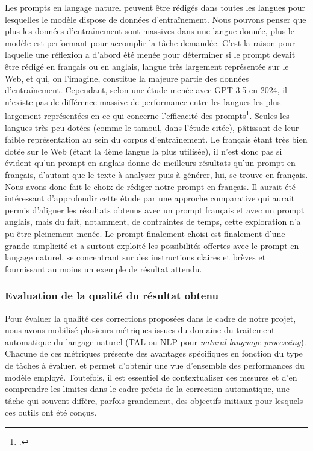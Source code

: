 \newline
Les prompts en langage naturel peuvent être rédigés dans toutes les langues pour lesquelles le modèle dispose de données d’entraînement. Nous pouvons penser que plus les données d’entraînement sont massives dans une langue donnée, plus le modèle est performant pour accomplir la tâche demandée. C’est la raison pour laquelle une réflexion a d’abord été menée pour déterminer si le prompt devait être rédigé en français ou en anglais, langue très largement représentée sur le Web, et qui, on l’imagine, constitue la majeure partie des données d’entraînement. Cependant, selon une étude menée avec GPT 3.5 en 2024, il n’existe pas de différence massive de performance entre les langues les plus largement représentées en ce qui concerne l’efficacité des prompts\footcite{jordan_need_2024}. Seules les langues très peu dotées (comme le tamoul, dans l’étude citée), pâtissant de leur faible représentation au sein du corpus d’entraînement. Le français étant très bien dotée sur le Web (étant la 4ème langue la plus utilisée), il n’est donc pas si évident qu’un prompt en anglais donne de meilleurs résultats qu’un prompt en français, d’autant que le texte à analyser puis à générer, lui, se trouve en français. Nous avons donc fait le choix de rédiger notre prompt en français. Il aurait été intéressant d’approfondir cette étude par une approche comparative qui aurait permis d’aligner les résultats obtenus avec un prompt français et avec un prompt anglais, mais du fait, notamment, de contraintes de temps, cette exploration n’a pu être pleinement menée.
Le prompt finalement choisi est finalement d’une grande simplicité et a surtout exploité les possibilités offertes avec le prompt en langage naturel, se concentrant sur des instructions claires et brèves et fournissant au moins un exemple de résultat attendu.

\subsubsection{Evaluation de la qualité du résultat obtenu}
Pour évaluer la qualité des corrections proposées dans le cadre de notre projet, nous avons mobilisé plusieurs métriques issues du domaine du traitement automatique du langage naturel (TAL ou NLP pour \textit{natural language processing}). Chacune de ces métriques présente des avantages spécifiques en fonction du type de tâches à évaluer, et permet d’obtenir une vue d’ensemble des performances du modèle employé. Toutefois, il est essentiel de contextualiser ces mesures et d’en comprendre les limites dans le cadre précis de la correction automatique, une tâche qui souvent diffère, parfois grandement, des objectifs initiaux pour lesquels ces outils ont été conçus.

